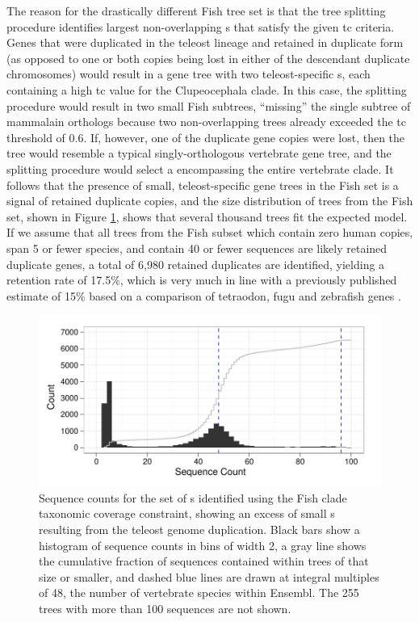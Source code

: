 The reason for the drastically different Fish tree set is that the
tree splitting procedure identifies largest non-overlapping \subtr{}s
that satisfy the given \ac{tc} criteria. Genes that were duplicated in the
teleost lineage and retained in duplicate form (as opposed to one or
both copies being lost in either of the descendant duplicate
chromosomes) would result in a gene tree with two teleost-specific
\subtr{}s, each containing a high \ac{tc} value for the Clupeocephala
clade. In this case, the splitting procedure would result in two small
Fish subtrees, ``missing'' the single subtree of mammalain orthologs
because two non-overlapping trees already exceeded the \ac{tc} threshold of
0.6. If, however, one of the duplicate gene copies were lost, then the
tree would resemble a typical singly-orthologous vertebrate gene tree,
and the splitting procedure would select a \subtr encompassing the
entire vertebrate clade. It follows that the presence of small,
teleost-specific gene trees in the Fish set is a signal of retained
duplicate copies, and the size distribution of trees from the Fish
set, shown in Figure \ref{ensembl_fish_hist}, shows that several
thousand trees fit the expected model. If we assume that all trees
from the Fish subset which contain zero human copies, span 5 or fewer
species, and contain 40 or fewer sequences are likely retained
duplicate genes, a total of 6,980 retained duplicates are identified,
yielding a retention rate of 17.5\%, which is very much in line with a
previously published estimate of 15\% based on a comparison of
tetraodon, fugu and zebrafish genes \citep{Brunet2006}.

\begin{figure}
\centering
\includegraphics[scale=0.9]{Figs/ensembl_fish_hist.pdf}
\caption{Sequence counts for the set of \subtr{}s identified using the
  Fish clade taxonomic coverage constraint, showing an excess of small
 \subtr{}s resulting from the teleost genome duplication. Black bars show a
  histogram of sequence counts in bins of width 2, a gray line shows
  the cumulative fraction of sequences contained within trees of that
  size or smaller, and dashed blue lines are drawn at integral
  multiples of 48, the number of vertebrate species within
  Ensembl. The 255 trees with more than 100 sequences are not shown.}
\label{ensembl_fish_hist}
\end{figure}

